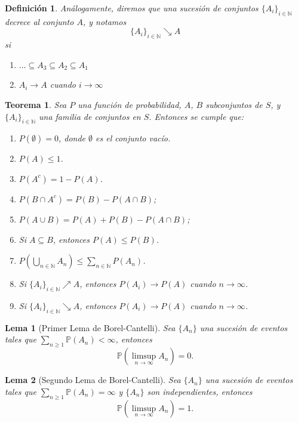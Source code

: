 \documentclass{report}
\newtheorem{thm}{Teorema}[section]
\newtheorem{lem}{Lema}[section]
\newtheorem{dfn}{Definición}[section]
\begin{document}
\begin{dfn}
Análogamente, diremos que una sucesión de conjuntos $\{A_i\}_{i\in\mathbb{N}}$ \emph{decrece} al conjunto $A$, y notamos
$$
\{A_i\}_{i\in\mathbb{N}}\searrow A
$$
si
\begin{enumerate}
    \item $\ldots \subseteq A_3 \subseteq A_2 \subseteq A_1 $
    \item $A_i \rightarrow A$ cuando $i\rightarrow \infty$
\end{enumerate}
\end{dfn}

\begin{thm}
Sea \( P \) una función de probabilidad, $A$, $B$ subconjuntos de \(S\), y $\{A_i\}_{i\in\mathbb{N}}$ una familia de conjuntos en $S$.
Entonces se cumple que:

\begin{enumerate}
    \item \( P(\emptyset) = 0 \), donde \( \emptyset \) es el conjunto vacío.
    \item \( P(A) \leq 1 \).
    \item \( P(A^c) = 1 - P(A) \).
    \item \( P(B \cap A^c) = P(B) - P(A \cap B) \);
    \item \( P(A \cup B) = P(A) + P(B) - P(A \cap B) \);
    \item Si \( A \subseteq B \), entonces \( P(A) \leq P(B) \).
    \item $P\left(\bigcup_{n\in\mathbb{N}}A_n\right) \leq \sum_{n\in\mathbb{N}}P(A_n)$.
    \item Si $\{A_i\}_{i\in\mathbb{N}}\nearrow A$, entonces $P(A_i)\rightarrow P(A)$ cuando $n\rightarrow \infty$.
    \item Si $\{A_i\}_{i\in\mathbb{N}}\searrow A$, entonces $P(A_i)\rightarrow P(A)$ cuando $n\rightarrow \infty$.
\end{enumerate}
\end{thm}

\begin{lem}[Primer Lema de Borel-Cantelli] \label{primer lema de Borel-Cantelli}
Sea \( \{A_n\} \) una sucesión de eventos tales que \( \sum_{n \geq 1} \mathbb{P}(A_n) < \infty \), entonces
\[
\mathbb{P} \left( \limsup_{n \to \infty} A_n \right) = 0.
\]
\end{lem}

\begin{lem}[Segundo Lema de Borel-Cantelli] \label{segundo  lema de Borel-Cantelli}
Sea \( \{A_n\} \) una sucesión de eventos tales que \( \sum_{n \geq 1} \mathbb{P}(A_n) = \infty \) y \( \{A_n\} \) son independientes, entonces
\[
\mathbb{P} \left( \limsup_{n \to \infty} A_n \right) = 1.
\]
\end{lem}
\end{document}
